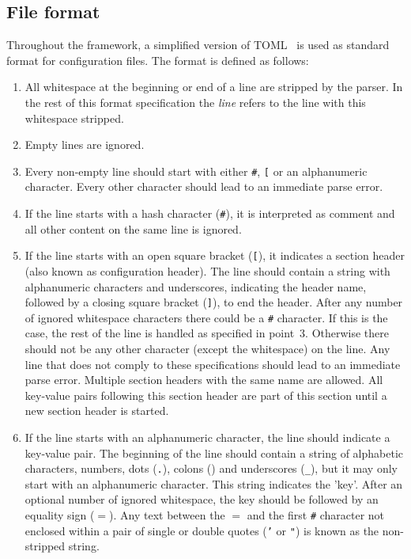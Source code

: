 \subsection{File format}
\label{sec:config_file_format}
Throughout the framework, a simplified version of TOML~\cite{tomlgit} is used as standard format for configuration files.
The format is defined as follows:
\begin{enumerate}
\item All whitespace at the beginning or end of a line are stripped by the parser.
In the rest of this format specification the \textit{line} refers to the line with this whitespace stripped.
\item Empty lines are ignored.
\item Every non-empty line should start with either \texttt{\#}, \texttt{[} or an alphanumeric character.
Every other character should lead to an immediate parse error.
\item If the line starts with a hash character (\texttt{\#}), it is interpreted as comment and all other content on the same line is ignored.
\item If the line starts with an open square bracket (\texttt{[}), it indicates a section header (also known as configuration header).
The line should contain a string with alphanumeric characters and underscores, indicating the header name, followed by a closing square bracket (\texttt{]}), to end the header.
After any number of ignored whitespace characters there could be a \texttt{\#} character.
If this is the case, the rest of the line is handled as specified in point~3.
Otherwise there should not be any other character (except the whitespace) on the line.
Any line that does not comply to these specifications should lead to an immediate parse error.
Multiple section headers with the same name are allowed.
All key-value pairs following this section header are part of this section until a new section header is started.
\item If the line starts with an alphanumeric character, the line should indicate a key-value pair.
The beginning of the line should contain a string of alphabetic characters, numbers, dots (\texttt{.}), colons (\texttt{\:}) and underscores (\texttt{\_}), but it may only start with an alphanumeric character.
This string indicates the 'key'.
After an optional number of ignored whitespace, the key should be followed by an equality sign (\texttt{$=$}).
Any text between the \texttt{$=$} and the first \texttt{\#} character not enclosed within a pair of single or double quotes (\texttt{'} or \texttt{"}) is known as the non-stripped string.

\end{enumerate}
